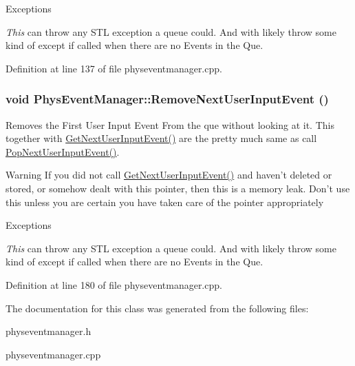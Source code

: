 \begin{DoxyExceptions}{Exceptions}
\item[{\em This}]can throw any STL exception a queue could. And with likely throw some kind of except if called when there are no Events in the Que. \end{DoxyExceptions}


Definition at line 137 of file physeventmanager.cpp.\hypertarget{classPhysEventManager_a9c6f5296c9961fa469ebe06d7599283a}{
\subsubsection[{RemoveNextUserInputEvent}]{\setlength{\rightskip}{0pt plus 5cm}void PhysEventManager::RemoveNextUserInputEvent ()}}
\label{d5/dd7/classPhysEventManager_a9c6f5296c9961fa469ebe06d7599283a}


Removes the First User Input Event From the que without looking at it. This together with \hyperlink{classPhysEventManager_a4874a9b1138d2351bf28e527a66c02b8}{GetNextUserInputEvent()} are the pretty much same as call \hyperlink{classPhysEventManager_ad6612a6e1c728941e2c467e7f136ca51}{PopNextUserInputEvent()}. \begin{DoxyWarning}{Warning}
If you did not call \hyperlink{classPhysEventManager_a4874a9b1138d2351bf28e527a66c02b8}{GetNextUserInputEvent()} and haven't deleted or stored, or somehow dealt with this pointer, then this is a memory leak. Don't use this unless you are certain you have taken care of the pointer appropriately 
\end{DoxyWarning}

\begin{DoxyExceptions}{Exceptions}
\item[{\em This}]can throw any STL exception a queue could. And with likely throw some kind of except if called when there are no Events in the Que. \end{DoxyExceptions}


Definition at line 180 of file physeventmanager.cpp.

The documentation for this class was generated from the following files:\begin{DoxyCompactItemize}
\item 
physeventmanager.h\item 
physeventmanager.cpp\end{DoxyCompactItemize}
